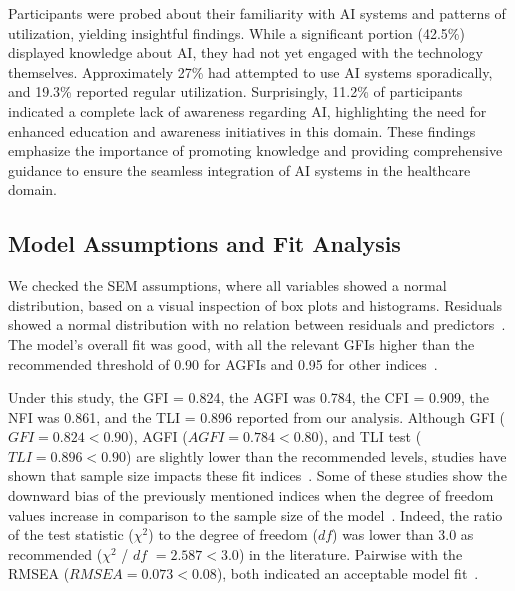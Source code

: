 Participants were probed about their familiarity with \ac{AI} systems and patterns of utilization, yielding insightful findings.
While a significant portion (42.5\%) displayed knowledge about \ac{AI}, they had not yet engaged with the technology themselves.
Approximately 27\% had attempted to use \ac{AI} systems sporadically, and 19.3\% reported regular utilization.
Surprisingly, 11.2\% of participants indicated a complete lack of awareness regarding \ac{AI}, highlighting the need for enhanced education and awareness initiatives in this domain.
These findings emphasize the importance of promoting knowledge and providing comprehensive guidance to ensure the seamless integration of \ac{AI} systems in the healthcare domain.

\subsection{Model Assumptions and Fit Analysis}
\label{chap:app003004001}

We checked the \ac{SEM} assumptions, where all variables showed a normal distribution, based on a visual inspection of box plots and histograms.
Residuals showed a normal distribution with no relation between residuals and predictors~\cite{murtagh2012multivariate}.
The model's overall fit was good, with all the relevant \acp{GFI} higher than the recommended threshold of 0.90 for \acp{AGFI} and 0.95 for other indices~\cite{Bagozzi2012, doi:10.1504/IJMDA.2017.087624, murtagh2012multivariate, SUMAK2016602}.

Under this study, the \ac{GFI} = 0.824, the \ac{AGFI} was 0.784, the \ac{CFI} = 0.909, the \ac{NFI} was 0.861, and the \ac{TLI} = 0.896 reported from our analysis.
Although \ac{GFI} ($GFI = 0.824 < 0.90$), \ac{AGFI} ($AGFI = 0.784 < 0.80$), and \ac{TLI} test ($TLI = 0.896 < 0.90$) are slightly lower than the recommended levels, studies have shown that sample size impacts these fit indices~\cite{KHALILZADEH2017460, doi:10.1080/00273171.2019.1602503, ZHOU2010760}.
Some of these studies show the downward bias of the previously mentioned indices when the degree of freedom values increase in comparison to the sample size of the model~\cite{doi:10.1080/00273171.2019.1602503}.
Indeed, the ratio of the test statistic ($\chi^2$) to the degree of freedom ($df$) was lower than 3.0 as recommended ($\chi^2$ / $df$ $= 2.587 < 3.0$) in the literature.
Pairwise with the \ac{RMSEA} ($RMSEA = 0.073 < 0.08$), both indicated an acceptable model fit~\cite{ZHOU2010760}.

